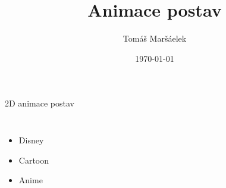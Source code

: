 \documentclass[14pt]{beamer}
\title{Animace postav}
\author{Tomáš Maršáelek}
\date{\today}
\begin{document}
\begin{frame}
\titlepage
\end{frame}

\begin{frame}{2D animace postav}
\begin{columns}[c]
\begin{itemize}[label=-]
	\item<1-> Disney
	\item<2-> Cartoon
	\item<3-> Anime
\end{itemize}
\centering
{}
\end{columns}


\end{frame}
\end{document}
